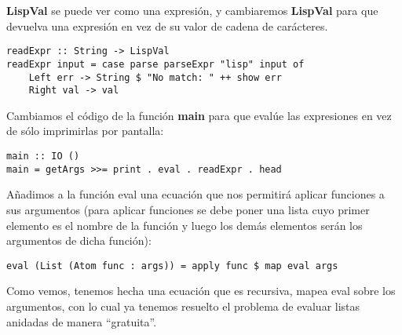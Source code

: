\textbf{LispVal} se puede ver como una expresi\'on, y cambiaremos \textbf{LispVal} para que devuelva una expresi\'on en vez de su valor de cadena de car\'acteres.\\

\begin{minipage}{\linewidth}
\begin{footnotesize}
\begin{lstlisting}[frame=single]
readExpr :: String -> LispVal
readExpr input = case parse parseExpr "lisp" input of
    Left err -> String $ "No match: " ++ show err
    Right val -> val
\end{lstlisting}
\end{footnotesize}
\end{minipage}

Cambiamos el c\'odigo de la funci\'on \textbf{main} para que eval\'ue las expresiones en vez de s\'olo imprimirlas por pantalla:\\

\begin{minipage}{\linewidth}
\begin{footnotesize}
\begin{lstlisting}[frame=single]
main :: IO ()
main = getArgs >>= print . eval . readExpr . head
\end{lstlisting}
\end{footnotesize}
\end{minipage}

A\~nadimos a la funci\'on eval una ecuaci\'on que nos permitir\'a aplicar funciones a sus argumentos (para aplicar funciones se debe poner una lista cuyo primer elemento es el nombre de la funci\'on y luego los dem\'as elementos ser\'an los argumentos de dicha funci\'on):\\

\begin{minipage}{\linewidth}
\begin{footnotesize}
\begin{lstlisting}[frame=single]
eval (List (Atom func : args)) = apply func $ map eval args
\end{lstlisting}
\end{footnotesize}
\end{minipage}

Como vemos, tenemos hecha una ecuaci\'on que es recursiva, mapea eval sobre los argumentos, con lo cual ya tenemos resuelto el problema de evaluar listas anidadas de manera ``gratuita''.\\

